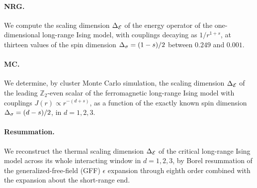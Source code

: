 \paragraph{NRG.} We compute the scaling dimension $\Delta_{\mathcal E}$ of the energy operator of the one-dimensional long-range Ising model, with couplings decaying as $1/r^{1+s}$, at thirteen values of the spin dimension $\Delta_\sigma=(1-s)/2$ between $0.249$ and $0.001$.

\paragraph{MC.} We determine, by cluster Monte Carlo simulation, the scaling dimension $\Delta_{\mathcal E}$ of the leading $\mathbb Z_2$-even scalar of the ferromagnetic long-range Ising model with couplings $J(r)\propto r^{-(d+s)}$, as a function of the exactly known spin dimension $\Delta_\sigma=(d-s)/2$, in $d=1,2,3$.

\paragraph{Resummation.} We reconstruct the thermal scaling dimension $\Delta_{\mathcal E}$ of the critical long-range Ising model across its whole interacting window in $d=1,2,3$, by Borel resummation of the generalized-free-field (GFF) $\epsilon$ expansion through eighth order combined with the expansion about the short-range end.
\endgroup
\clearpage
